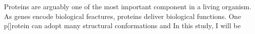 Proteins are arguably one of the most important component in a living organism. As genes encode biological feactures, proteins deliver biological functions. One p[]rotein can adopt many structural conformations and   In this study, I will be 